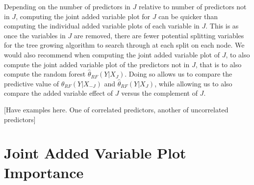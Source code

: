 \documentclass[12pt,twoside]{reedthesis}
\theoremstyle{definition}
\theoremstyle{definition}
\theoremstyle{definition}
\theoremstyle{remark}
\begin{document}
Depending on the number of predictors in \(J\) relative to number of
predictors not in \(J\), computing the joint added variable plot for
\(J\) can be quicker than computing the individual added variable plots
of each variable in \(J\). This is as once the variables in \(J\) are
removed, there are fewer potential splitting variables for the tree
growing algorithm to search through at each split on each node. We would
also recommend when computing the joint added variable plot of \(J\), to
also compute the joint added variable plot of the predictors not in
\(J\), that is to also compute the random forest
\(\hat{\theta}_{RF}(Y|X_J)\). Doing so allows us to compare the
predictive value of \(\hat{\theta}_{RF}(Y|X_{-J})\) and
\(\hat{\theta}_{RF}(Y|X_J)\), while allowing us to also compare the
added variable effect of \(J\) versus the complement of \(J\). \par

{[}Have examples here. One of correlated predictors, another of
uncorrelated predictors{]}

\section{Joint Added Variable Plot
Importance}\label{joint-added-variable-plot-importance-1}
\end{document}
